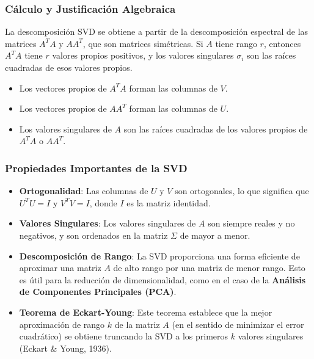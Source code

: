 \documentclass[12pt]{article}
\begin{document}
        \subsubsection*{Cálculo y Justificación Algebraica}
        
        La descomposición SVD se obtiene a partir de la descomposición espectral de las matrices $A^T A$ y $A A^T$, que son matrices simétricas. Si $A$ tiene rango $r$, entonces $A^T A$ tiene $r$ valores propios positivos, y los valores singulares $\sigma_i$ son las raíces cuadradas de esos valores propios.
        \begin{itemize}
                \item Los vectores propios de $A^T A$ forman las columnas de $V$.
                \item Los vectores propios de $A A^T$ forman las columnas de $U$.
                \item Los valores singulares de $A$ son las raíces cuadradas de los valores propios de $A^T A$ o $A A^T$.
        \end{itemize}
        
        \subsubsection*{Propiedades Importantes de la SVD}
        
        \begin{itemize}
                \item \textbf{Ortogonalidad}: Las columnas de $U$ y $V$ son ortogonales, lo que significa que $U^T U = I$ y $V^T V = I$, donde $I$ es la matriz identidad.
                \item \textbf{Valores Singulares}: Los valores singulares de $A$ son siempre reales y no negativos, y son ordenados en la matriz $\Sigma$ de mayor a menor.
                \item \textbf{Descomposición de Rango}: La SVD proporciona una forma eficiente de aproximar una matriz $A$ de alto rango por una matriz de menor rango. Esto es útil para la reducción de dimensionalidad, como en el caso de la \textbf{Análisis de Componentes Principales (PCA)}.
                \item \textbf{Teorema de Eckart-Young}: Este teorema establece que la mejor aproximación de rango $k$ de la matriz $A$ (en el sentido de minimizar el error cuadrático) se obtiene truncando la SVD a los primeros $k$ valores singulares (Eckart \& Young, 1936).
        \end{itemize}
        
\end{document}
